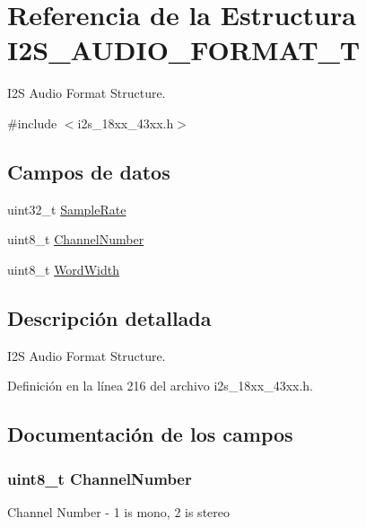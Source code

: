 \hypertarget{struct_i2_s___a_u_d_i_o___f_o_r_m_a_t___t}{}\section{Referencia de la Estructura I2\+S\+\_\+\+A\+U\+D\+I\+O\+\_\+\+F\+O\+R\+M\+A\+T\+\_\+T}
\label{struct_i2_s___a_u_d_i_o___f_o_r_m_a_t___t}


I2S Audio Format Structure.  




{\ttfamily \#include $<$i2s\+\_\+18xx\+\_\+43xx.\+h$>$}

\subsection*{Campos de datos}
\begin{DoxyCompactItemize}
\item 
uint32\+\_\+t \hyperlink{struct_i2_s___a_u_d_i_o___f_o_r_m_a_t___t_a930ec675cfdc1a0f18f3414583f7b950}{Sample\+Rate}
\item 
uint8\+\_\+t \hyperlink{struct_i2_s___a_u_d_i_o___f_o_r_m_a_t___t_af735e23324626601fb3ef1ba2f9098ca}{Channel\+Number}
\item 
uint8\+\_\+t \hyperlink{struct_i2_s___a_u_d_i_o___f_o_r_m_a_t___t_af7bd178db9673a9753c589a27fa0495f}{Word\+Width}
\end{DoxyCompactItemize}


\subsection{Descripción detallada}
I2S Audio Format Structure. 

Definición en la línea 216 del archivo i2s\+\_\+18xx\+\_\+43xx.\+h.



\subsection{Documentación de los campos}
\subsubsection[{\texorpdfstring{Channel\+Number}{ChannelNumber}}]{\setlength{\rightskip}{0pt plus 5cm}uint8\+\_\+t Channel\+Number}\hypertarget{struct_i2_s___a_u_d_i_o___f_o_r_m_a_t___t_af735e23324626601fb3ef1ba2f9098ca}{}\label{struct_i2_s___a_u_d_i_o___f_o_r_m_a_t___t_af735e23324626601fb3ef1ba2f9098ca}
Channel Number -\/ 1 is mono, 2 is stereo 

